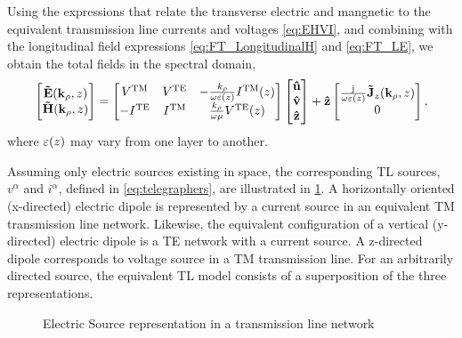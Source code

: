 \documentclass[12pt]{article}
\begin{document}
Using the expressions that relate the transverse electric and mangnetic to the equivalent transmission line currents and voltages \eqref{eq:EHVI}, and combining with the longitudinal field expressions \eqref{eq:FT_LongitudinalH} and \eqref{eq:FT_LE}, we obtain the total fields in the spectral domain,
%
%
\begin{equation}
  \begin{bmatrix}
    \mathbf{\tilde{E}}(\mathbf{k}_{\rho},z) \\
    \mathbf{\tilde{H}}(\mathbf{k}_{\rho},z)
  \end{bmatrix}
  =
  \begin{bmatrix}
    V^{\mathrm{TM}} & V^{\mathrm{TE}} & -\frac{k_{\rho}}{\omega \varepsilon(z)}   I^{\mathrm{TM}}(z) \\
    -I^{\mathrm{TE}} & I^{\mathrm{TM}} & \frac{k_{\rho}}{\omega \mu}   V^{\mathrm{TE}}(z)
  \end{bmatrix}
  \begin{bmatrix}
    \mathbf{\hat u} \\
    \mathbf{\hat v} \\
    \mathbf{\hat z} \\
  \end{bmatrix} + \mathbf{\hat z}
  \begin{bmatrix}
    \frac{\mathrm{j}\mkern1mu}{\omega \varepsilon(z)}     \mathbf{\tilde{J}}_z(\mathbf{k}_{\rho},z) \\
    0
  \end{bmatrix}
  \label{eq:totalEHVI},
\end{equation}
%
where $\varepsilon(z)$ may vary from one layer to another.

Assuming only electric sources existing in space, the corresponding TL sources, $v^{\alpha}$ and $i^{\alpha}$, defined in \eqref{eq:telegraphers}, are illustrated in \ref{fig:J_sources}. A horizontally oriented (x-directed) electric dipole is represented by a current source in an equivalent TM transmission line network. Likewise, the equivalent configuration of a vertical (y-directed) electric dipole is a TE network with a current source. A z-directed dipole corresponds to voltage source in a TM transmission line. For an arbitrarily directed source, the equivalent TL model consists of a superposition of the three representations.
%
\begin{figure}[h!]
  \centering
  \def\svgwidth{.75\linewidth}
  
  \caption{Electric Source representation in a transmission line network}
  \label{fig:J_sources}
\end{figure}
%
\end{document}

